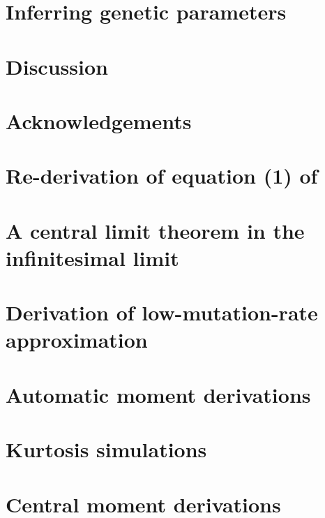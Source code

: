 \documentclass{article}
\newcommand{\beginsupplement}{%
        \setcounter{table}{0}
        \renewcommand{\thetable}{S\arabic{table}}%
        \setcounter{figure}{0}
        \renewcommand{\thefigure}{S\arabic{figure}}%
     }
\begin{document}
\section{Inferring genetic parameters}

\section{Discussion}

\section*{Acknowledgements}

 

\clearpage

\appendix
\beginsupplement

\section{Re-derivation of equation (1) of \citet{Schraiber2015}}
\label{slrederive}

\section{A central limit theorem in the infinitesimal limit}
\label{clt}

\section{Derivation of low-mutation-rate approximation}
\label{lmr_der}

\section{Automatic moment derivations}
\label{symmath}

\section{Kurtosis simulations}
\label{kurtsim}

\section{Central moment derivations}
\label{moments}

\end{document}

